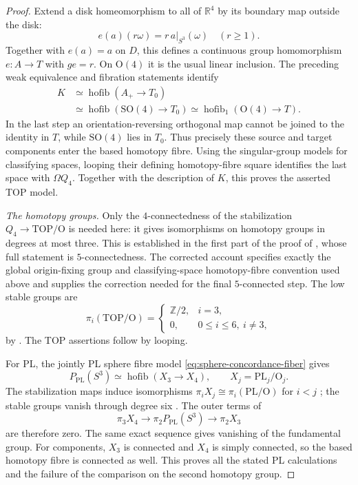 \begin{proof}
Extend a disk homeomorphism to all of $\mathbb R^4$ by its
boundary map outside the disk:
\[
                  e(a)(r\omega)=r\,a|_{S^3}(\omega)
                         \quad(r\geq1).
\]
Together with $e(a)=a$ on $D$, this defines a continuous group
homomorphism $e:A\to T$ with $ge=r$.  On $\mathrm O(4)$ it is
the usual linear inclusion.  The preceding weak equivalence and
fibration statements identify
\[
 \begin{aligned}
 K&\simeq\operatorname{hofib}(A_+\longrightarrow T_0)\\
  &\simeq\operatorname{hofib}(\mathrm{SO}(4)\longrightarrow T_0)
   \simeq\operatorname{hofib}_1(\mathrm O(4)\longrightarrow T).
 \end{aligned}
\]
In the last step an orientation-reversing orthogonal map cannot
be joined to the identity in $T$, while $\mathrm{SO}(4)$ lies
in $T_0$.  Thus precisely these source and target components
enter the based homotopy fibre.  Using the singular-group models
for classifying spaces, looping their defining homotopy-fibre
square identifies the last space with $\Omega Q_4$.  Together
with the description of $K$, this proves the asserted TOP model.

\medskip\noindent\textit{The homotopy groups.}
Only the $4$-connectedness of the stabilization
$Q_4\to\mathrm{TOP}/\mathrm O$ is needed here: it gives
isomorphisms on homotopy groups in degrees at most three.
This is established in the first part of the proof of
\cite[Theorem~8.7A, p.~128; proof on pp.~130--131]{FreedmanQuinn1990},
whose full statement is $5$-connectedness.
The corrected account
\cite[Section~1.1, Theorem~1.3 and the following paragraph,
p.~2]{GabaiGayHartmanKrushkalPowell2026}
specifies exactly the global origin-fixing group and
classifying-space homotopy-fibre convention used above and
supplies the correction needed for the final $5$-connected step.
The low stable groups are
\[
 \pi_i(\mathrm{TOP}/\mathrm O)=
 \begin{cases}
 \mathbb Z/2,&i=3,\\
 0,&0\leq i\leq6,\ i\ne3,
 \end{cases}
\]
by \cite[Essay~V, Theorem~5.5(II), pp.~251--252]{KirbySiebenmann1977}.
The TOP assertions follow by looping.

For PL, the jointly PL sphere fibre model
\eqref{eq:sphere-concordance-fiber} gives
\[
 P_{\mathrm{PL}}(S^3)\simeq
       \operatorname{hofib}(X_3\longrightarrow X_4),
       \qquad X_j=\mathrm{PL}_j/\mathrm O_j.
\]
The stabilization maps induce isomorphisms
$\pi_iX_j\cong\pi_i(\mathrm{PL}/\mathrm O)$ for $i<j$
\cite[Section~5, formula~(3), p.~37]{BurgheleaLashof1974II};
the stable groups vanish through degree six
\cite[Annex~C, p.~318]{KirbySiebenmann1977}.
The outer terms of
\[
 \pi_3X_4\longrightarrow\pi_2P_{\mathrm{PL}}(S^3)
                          \longrightarrow\pi_2X_3
\]
are therefore zero.  The same exact sequence gives vanishing
of the fundamental group.  For components, $X_3$ is connected
and $X_4$ is simply connected, so the based homotopy fibre is
connected as well.  This proves all the stated PL calculations
and the failure of the comparison on the second homotopy group.
\end{proof}
